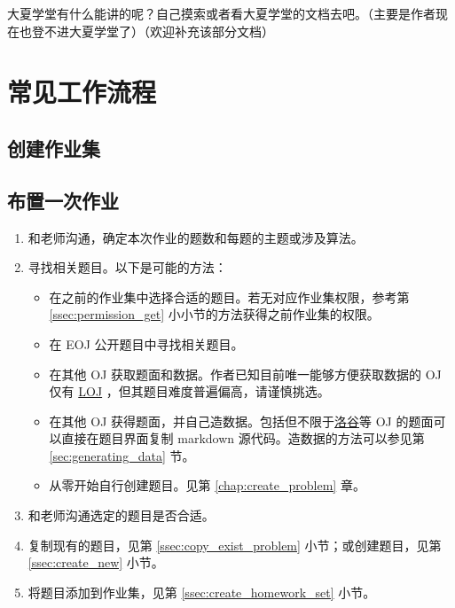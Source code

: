 \documentclass[oneside]{book}
\begin{document}
\label{chap:elearning}


大夏学堂有什么能讲的呢？自己摸索或者看大夏学堂的文档去吧。（主要是作者现在也登不进大夏学堂了）（欢迎补充该部分文档）

\chapter{常见工作流程}

\label{chap:workflow}

\section{创建作业集}


\section{布置一次作业}

\begin{enumerate}
  \item 和老师沟通，确定本次作业的题数和每题的主题或涉及算法。
  \item 寻找相关题目。以下是可能的方法：
  \begin{itemize}
    \item 在之前的作业集中选择合适的题目。若无对应作业集权限，参考第 \ref{ssec:permission_get} 小小节的方法获得之前作业集的权限。
    \item 在 EOJ 公开题目中寻找相关题目。
    \item 在其他 OJ 获取题面和数据。作者已知目前唯一能够方便获取数据的 OJ 仅有 \href{https://loj.ac/}{LOJ} ，但其题目难度普遍偏高，请谨慎挑选。
    \item 在其他 OJ 获得题面，并自己造数据。包括但不限于\href{https://www.luogu.com.cn/}{洛谷}等 OJ 的题面可以直接在题目界面复制 markdown 源代码。造数据的方法可以参见第 \ref{sec:generating_data} 节。
    \item 从零开始自行创建题目。见第 \ref{chap:create_problem} 章。
  \end{itemize}
  \item 和老师沟通选定的题目是否合适。
  \item 复制现有的题目，见第 \ref{ssec:copy_exist_problem} 小节；或创建题目，见第 \ref{ssec:create_new} 小节。
  \item 将题目添加到作业集，见第 \ref{ssec:create_homework_set} 小节。
\end{enumerate}
\end{document}
